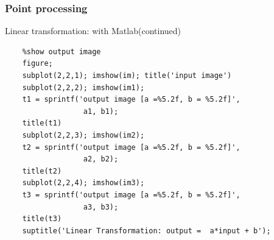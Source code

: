 \documentclass[english,11pt,table,handout]{beamer}
\begin{document}
\begin{frame}[fragile]
\frametitle{Point processing}
\begin{block}{Linear transformation: with Matlab(continued)}
	\begin{lstlisting}
	%show output image
	figure;
	subplot(2,2,1); imshow(im); title('input image')
	subplot(2,2,2); imshow(im1); 
	t1 = sprintf('output image [a =%5.2f, b = %5.2f]',
	              a1, b1); 
	title(t1)
	subplot(2,2,3); imshow(im2); 
	t2 = sprintf('output image [a =%5.2f, b = %5.2f]', 
	              a2, b2); 
	title(t2)
	subplot(2,2,4); imshow(im3); 
	t3 = sprintf('output image [a =%5.2f, b = %5.2f]', 
	              a3, b3); 
	title(t3)
	suptitle('Linear Transformation: output =  a*input + b');	
	\end{lstlisting}
\end{block}
\end{frame}
\end{document}
